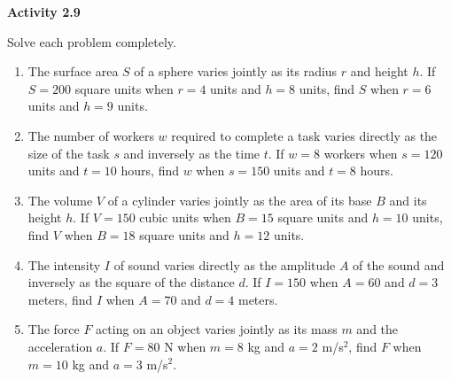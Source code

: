 \vspace{0.3ex}
\noindent\textbf{Activity 2.9}

\vspace{0.2ex}

Solve each problem completely.
\begin{enumerate}[noitemsep, label = \color{blue}\arabic*. ]
\item The surface area \(S\) of a sphere varies jointly as its radius \(r\) and height \(h\). If \(S = 200\) square units when \(r = 4\) units and \(h = 8\) units, find \(S\) when \(r = 6\) units and \(h = 9\) units.
   \item The number of workers \(w\) required to complete a task varies directly as the size of the task \(s\) and inversely as the time \(t\). If \(w = 8\) workers when \(s = 120\) units and \(t = 10\) hours, find \(w\) when \(s = 150\) units and \(t = 8\) hours.
    \item The volume \(V\) of a cylinder varies jointly as the area of its base \(B\) and its height \(h\). If \(V = 150\) cubic units when \(B = 15\) square units and \(h = 10\) units, find \(V\) when \(B = 18\) square units and \(h = 12\) units.
    \item The intensity \(I\) of sound varies directly as the amplitude \(A\) of the sound and inversely as the square of the distance \(d\). If \(I = 150\) when \(A = 60\) and \(d = 3\) meters, find \(I\) when \(A = 70\) and \(d = 4\) meters.
    \item The force \(F\) acting on an object varies jointly as its mass \(m\) and the acceleration \(a\). If \(F = 80\) N when \(m = 8\) kg and \(a = 2\) m/s\(^2\), find \(F\) when \(m = 10\) kg and \(a = 3\) m/s\(^2\).


 

\end{enumerate}
